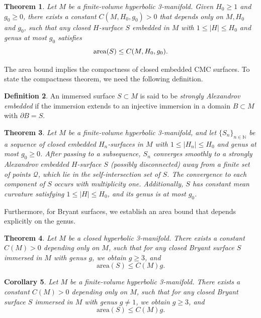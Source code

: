 \documentclass[12pt,a4paper]{amsart}
\numberwithin{equation}{section}
\theoremstyle{plain}
\newtheorem{Th}{Theorem}[section]
\newtheorem{Cor}[Th]{Corollary}
\theoremstyle{named}
\theoremstyle{definition}
\newtheorem{Def}[Th]{Definition}
\newcommand{\area}{{\rm{area}}}
\begin{document}
\begin{Th}\label{thm_area_bound}
Let $M$ be a finite-volume hyperbolic 3-manifold. Given $H_0\geq 1$ and $g_0\geq 0$, there exists a constant $C(M,H_0,g_0)>0$ that depends only on $M,H_0$ and $g_0$, such that any closed $H$-surface $S$ embedded in $M$ with $1\leq |H|\leq H_0$ and genus at most $g_0$ satisfies 
    \begin{equation*}
        \area(S)\leq C(M, H_0, g_0).
    \end{equation*}
\end{Th}

The area bound implies the compactness of closed embedded CMC surfaces. To state the compactness theorem, we need the following definition. 

\begin{Def}
    An immersed surface $S\subset M$ is said to be \emph{strongly Alexandrov embedded} if the immersion extends to an injective immersion in a domain $B\subset M$ with $\partial B=S$.
\end{Def}

\begin{Th}\label{thm_compactness}
    Let $M$ be a finite-volume hyperbolic 3-manifold, and let $\{S_n\}_{n\in\mathbb{N}}$ be a sequence of closed embedded $H_n$-surfaces in $M$ with $1\leq |H_n|\leq H_0$ and genus at most $g_0\geq 0$. After passing to a subsequence, $S_n$ converges smoothly to a strongly Alexandrov embedded $H$-surface $S$ (possibly disconnected) away from a finite set of points $\mathcal{Q}$, which lie in the self-intersection set of $S$. The convergence to each component of $S$ occurs with multiplicity one. Additionally, $S$ has constant mean curvature satisfying $1\leq |H|\leq H_0$, and its genus is at most $g_0$.
\end{Th}


Furthermore, for Bryant surfaces, we establish an area bound that depends explicitly on the genus.

\begin{Th}\label{thm_bryant area bound}
    Let $M$ be a closed hyperbolic 3-manifold.
    There exists a constant $C(M)>0$ depending only on $M$, such that for any closed Bryant surface $S$ immersed in $M$ with genus $g$, we obtain $g\geq 3$, and
    \begin{equation*}
        \text{area}(S)\leq C(M)g.
    \end{equation*}
\end{Th}

\begin{Cor}\label{cor_bryant area bound}
     Let $M$ be a finite-volume hyperbolic 3-manifold.
    There exists a constant $C(M)>0$ depending only on $M$, such that for any closed Bryant surface $S$ immersed in $M$ with genus $g\neq 1$, we obtain $g\geq 3$, and
    \begin{equation*}
        \text{area}(S)\leq C(M)g.
    \end{equation*}
\end{Cor}
\end{document}
